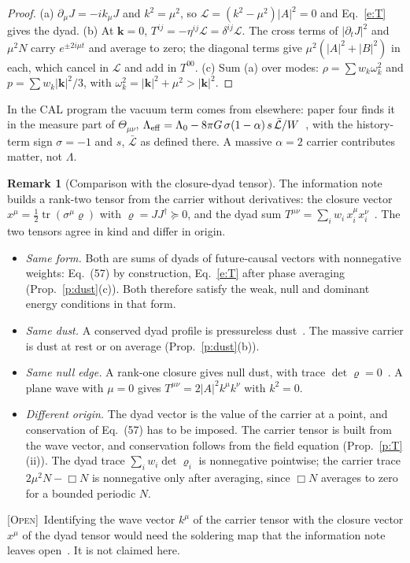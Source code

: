 \documentclass[10pt]{article}
\newcommand{\tr}{\operatorname{tr}}
\theoremstyle{definition}
\newtheorem{remark}[theorem]{Remark}
\newcommand{\Open}{\textup{\textsc{[Open]}}\ }
\begin{document}
\begin{proof}
(a) $\partial_\mu J=-ik_\mu J$ and $k^2=\mu^2$, so $\mathcal L=(k^2-\mu^2)|A|^2=0$ and Eq.~\eqref{e:T} gives the dyad. (b) At $\mathbf k=0$, $T^{ij}=-\eta^{ij}\mathcal L=\delta^{ij}\mathcal L$. The cross terms of $|\partial_tJ|^2$ and $\mu^2N$ carry $e^{\pm2i\mu t}$ and average to zero; the diagonal terms give $\mu^2(|A|^2+|B|^2)$ in each, which cancel in $\mathcal L$ and add in $T^{00}$. (c) Sum (a) over modes: $\rho=\sum w_k\omega_k^2$ and $p=\sum w_k|\mathbf k|^2/3$, with $\omega_k^2=|\mathbf k|^2+\mu^2>|\mathbf k|^2$.
\end{proof}

In the CAL program the vacuum term comes from elsewhere: paper four finds it in the measure part of $\Theta_{\mu\nu}$, $\Lambda_{\rm eff}=\Lambda_0-8\pi G\,\sigma(1-\alpha)\,s\,\bar{\mathcal L}/W$~\cite[Sec.~6, vacuum-term corollary]{varclos}, with the history-term sign $\sigma=-1$ and $s$, $\bar{\mathcal L}$ as defined there. A massive $\alpha=2$ carrier contributes matter, not $\Lambda$.

\begin{remark}[Comparison with the closure-dyad tensor]\label{r:dyad}
The information note builds a rank-two tensor from the carrier without derivatives: the closure vector $x^\mu=\tfrac12\tr(\sigma^\mu\varrho)$ with $\varrho=JJ^\dagger\succeq0$, and the dyad sum $T^{\mu\nu}=\sum_iw_i\,x_i^\mu x_i^\nu$~\cite[Eqs.~(56)--(57)]{infonote}. The two tensors agree in kind and differ in origin.
\begin{itemize}\itemsep1pt
\item \emph{Same form.} Both are sums of dyads of future-causal vectors with nonnegative weights: Eq.~(57) by construction, Eq.~\eqref{e:T} after phase averaging (Prop.~\ref{p:dust}(c)). Both therefore satisfy the weak, null and dominant energy conditions in that form.
\item \emph{Same dust.} A conserved dyad profile is pressureless dust~\cite[Sketch~3]{infonote}. The massive carrier is dust at rest or on average (Prop.~\ref{p:dust}(b)).
\item \emph{Same null edge.} A rank-one closure gives null dust, with trace $\det\varrho=0$~\cite[Eq.~(58)]{infonote}. A plane wave with $\mu=0$ gives $T^{\mu\nu}=2|A|^2k^\mu k^\nu$ with $k^2=0$.
\item \emph{Different origin.} The dyad vector is the value of the carrier at a point, and conservation of Eq.~(57) has to be imposed. The carrier tensor is built from the wave vector, and conservation follows from the field equation (Prop.~\ref{p:T}(ii)). The dyad trace $\sum_iw_i\det\varrho_i$ is nonnegative pointwise; the carrier trace $2\mu^2N-\Box N$ is nonnegative only after averaging, since $\Box N$ averages to zero for a bounded periodic $N$.
\end{itemize}
\Open Identifying the wave vector $k^\mu$ of the carrier tensor with the closure vector $x^\mu$ of the dyad tensor would need the soldering map that the information note leaves open~\cite[Sec.~3.3, Scope]{infonote}. It is not claimed here.
\end{remark}
\end{document}
